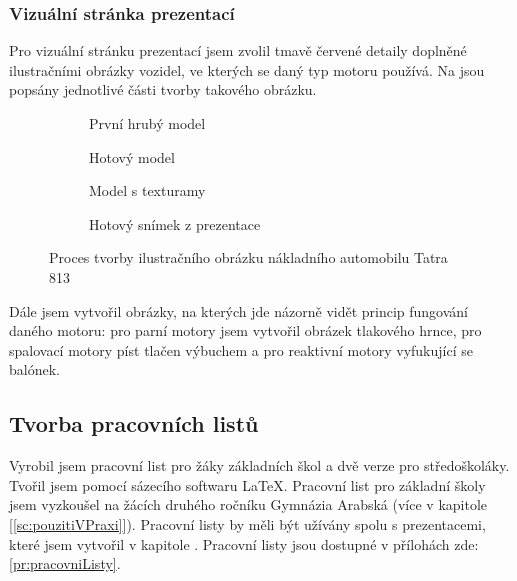 \subsubsection{Vizuální stránka prezentací}
{Pro vizuální stránku prezentací jsem zvolil tmavě červené detaily doplněné ilustračními obrázky vozidel, ve kterých se daný typ motoru používá. Na  jsou popsány jednotlivé části tvorby takového obrázku.}
\begin{figure}[H]
    \begin{subfigure}{0.5\textwidth}
        \centering
        \setlength{\fboxsep}{0pt}
        \caption{První hrubý model}
    \end{subfigure}
    \begin{subfigure}{0.5\linewidth}
        \centering
        \setlength{\fboxsep}{0pt}
        \caption{Hotový model}
    \end{subfigure}
    \begin{subfigure}{0.5\linewidth}
        \centering
        \setlength{\fboxsep}{0pt}
        \caption{Model s texturamy}
    \end{subfigure}
    \begin{subfigure}{0.5\linewidth}
        \centering
        \setlength{\fboxsep}{0pt}
        \caption{Hotový snímek z prezentace}
    \end{subfigure}
    \caption{Proces tvorby ilustračního obrázku nákladního automobilu Tatra 813 \jaObr}
    \label{obr:tatra813}
\end{figure}
{Dále jsem vytvořil obrázky, na kterých jde názorně vidět princip fungování daného motoru: pro parní motory jsem vytvořil obrázek tlakového hrnce, pro spalovací motory píst tlačen výbuchem a pro reaktivní motory vyfukující se balónek.}
\newpage
\subsection{Tvorba pracovních listů}
{Vyrobil jsem pracovní list pro žáky základních škol a dvě verze pro středoškoláky. Tvořil jsem pomocí sázecího softwaru \LaTeX. Pracovní list pro základní školy jsem vyzkoušel na žácích druhého ročníku Gymnázia Arabská (více v kapitole  [\ref{sc:pouzitiVPraxi}]). Pracovní listy by měli být užívány spolu s prezentacemi, které jsem vytvořil v kapitole .}\odst
{Pracovní listy jsou dostupné v přílohách zde: \ref{pr:pracovniListy}.}
